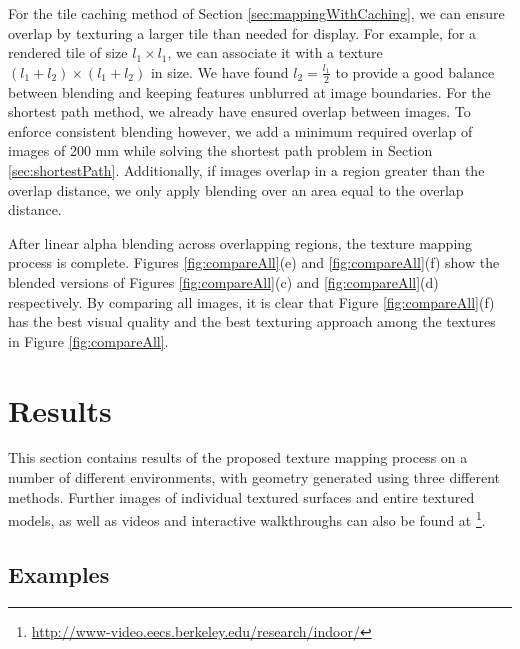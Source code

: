 \documentclass[]{spie}  %
\begin{document}
For the tile caching method of Section \ref{sec:mappingWithCaching},
we can ensure overlap by texturing a larger tile than needed for
display. For example, for a rendered tile of size $l_1 \times l_1$, we
can associate it with a texture $(l_1 + l_2) \times (l_1 + l_2)$ in
size.  We have found $l_2 = \frac{l_1}{2}$ to provide a good balance
between blending and keeping features unblurred at image
boundaries. For the shortest path method, we already have ensured
overlap between images. To enforce consistent blending however, we add
a minimum required overlap of images of 200 mm while solving the
shortest path problem in Section \ref{sec:shortestPath}. Additionally,
if images overlap in a region greater than the overlap distance, we
only apply blending over an area equal to the overlap distance.

After linear alpha blending across overlapping regions, the texture
mapping process is complete. Figures \ref{fig:compareAll}(e) and
\ref{fig:compareAll}(f) show the blended versions of Figures
\ref{fig:compareAll}(c) and \ref{fig:compareAll}(d) respectively. By
comparing all images, it is clear that Figure \ref{fig:compareAll}(f)
has the best visual quality and the best texturing approach among the
textures in Figure \ref{fig:compareAll}.



\section{Results}
\label{sec:results}
This section contains results of the proposed texture mapping process
on a number of different environments, with geometry generated using
three different methods. Further images of individual textured
surfaces and entire textured models, as well as videos and interactive
walkthroughs can also be found at
\footnote{\url{http://www-video.eecs.berkeley.edu/research/indoor/}}.

\subsection{Examples}
\label{sec:examples}
\end{document}

